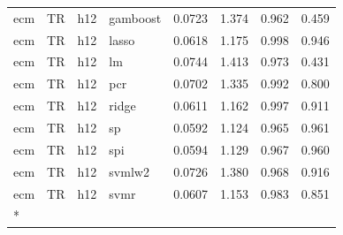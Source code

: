 \begin{ThreePartTable}
\begin{longtable}[t]{llclcccc}
ecm & TR & h12 & gamboost & 0.0723 & 1.374 & 0.962 & 0.459\\
ecm & TR & h12 & lasso & 0.0618 & 1.175 & 0.998 & 0.946\\
ecm & TR & h12 & lm & 0.0744 & 1.413 & 0.973 & 0.431\\
ecm & TR & h12 & pcr & 0.0702 & 1.335 & 0.992 & 0.800\\
ecm & TR & h12 & ridge & 0.0611 & 1.162 & 0.997 & 0.911\\
ecm & TR & h12 & sp & 0.0592 & 1.124 & 0.965 & 0.961\\
ecm & TR & h12 & spi & 0.0594 & 1.129 & 0.967 & 0.960\\
ecm & TR & h12 & svmlw2 & 0.0726 & 1.380 & 0.968 & 0.916\\
ecm & TR & h12 & svmr & 0.0607 & 1.153 & 0.983 & 0.851\\*
\end{longtable}
\end{ThreePartTable}
\endgroup{}
